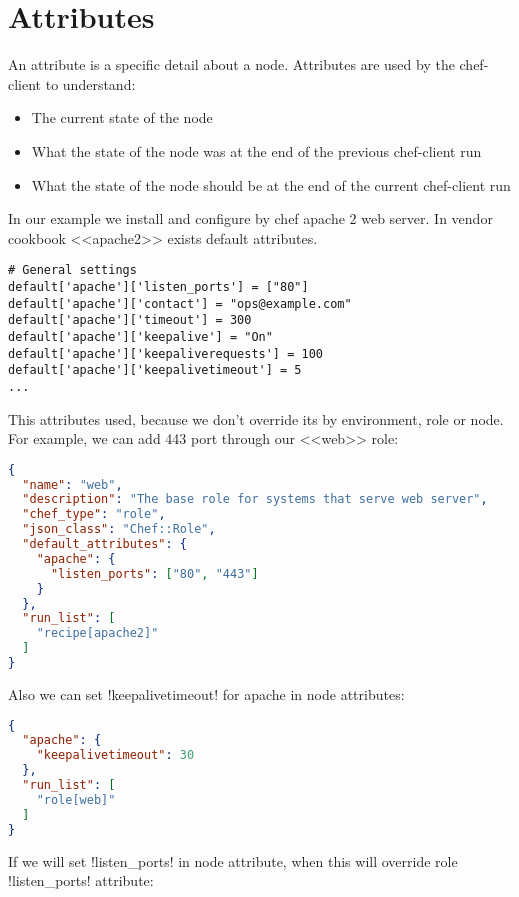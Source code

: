 \section{Attributes}
\label{sec:solo-attributes}

An attribute is a specific detail about a node. Attributes are used by the chef-client to understand:

\begin{itemize}
  \item The current state of the node
  \item What the state of the node was at the end of the previous chef-client run
  \item What the state of the node should be at the end of the current chef-client run
\end{itemize}

In our example we install and configure by chef apache 2 web server. In vendor cookbook <<apache2>> exists default attributes.

\begin{lstlisting}[label=lst:my-cloud-attributes1]
# General settings
default['apache']['listen_ports'] = ["80"]
default['apache']['contact'] = "ops@example.com"
default['apache']['timeout'] = 300
default['apache']['keepalive'] = "On"
default['apache']['keepaliverequests'] = 100
default['apache']['keepalivetimeout'] = 5
...
\end{lstlisting}

This attributes used, because we don't override its by environment, role or node. For example, we can add 443 port through our <<web>> role:

\begin{lstlisting}[language=JSON,label=lst:my-cloud-attributes2]
{
  "name": "web",
  "description": "The base role for systems that serve web server",
  "chef_type": "role",
  "json_class": "Chef::Role",
  "default_attributes": {
    "apache": {
      "listen_ports": ["80", "443"]
    }
  },
  "run_list": [
    "recipe[apache2]"
  ]
}
\end{lstlisting}

Also we can set \inline!keepalivetimeout! for apache in node attributes:

\begin{lstlisting}[language=JSON,label=lst:my-cloud-attributes3]
{
  "apache": {
    "keepalivetimeout": 30
  },
  "run_list": [
    "role[web]"
  ]
}
\end{lstlisting}

If we will set \inline!listen_ports! in node attribute, when this will override role \inline!listen_ports! attribute:

